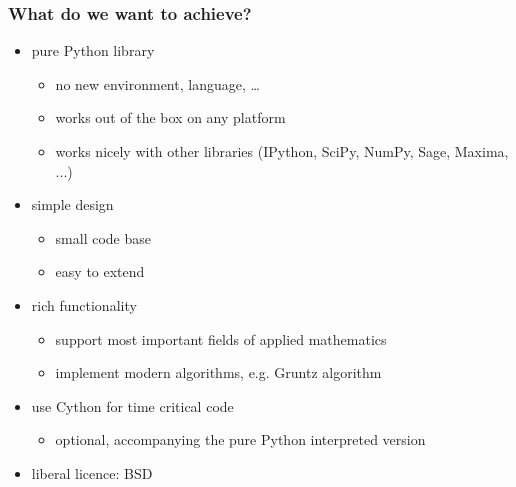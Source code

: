 \documentclass[handout]{beamer}
\begin{document}
\begin{frame}[fragile]
    \frametitle{What do we want to achieve?}

    \begin{itemize}
        \item<1-> pure Python library
            \begin{itemize}
                \item no new environment, language, \ldots
                \item works out of the box on any platform
                \item works nicely with other libraries (IPython, SciPy, NumPy, Sage, Maxima, ...)
            \end{itemize}
        \item<2-> simple design
            \begin{itemize}
                \item small code base
                \item easy to extend
            \end{itemize}
        \item<3-> rich functionality
            \begin{itemize}
                \item support most important fields of applied mathematics
                \item implement modern algorithms, e.g. Gruntz algorithm
            \end{itemize}
        \item<4-> use Cython for time critical code
            \begin{itemize}
                \item optional, accompanying the pure Python interpreted version
            \end{itemize}
        \item<5-> liberal licence: BSD
    \end{itemize}
\end{frame}
\end{document}

